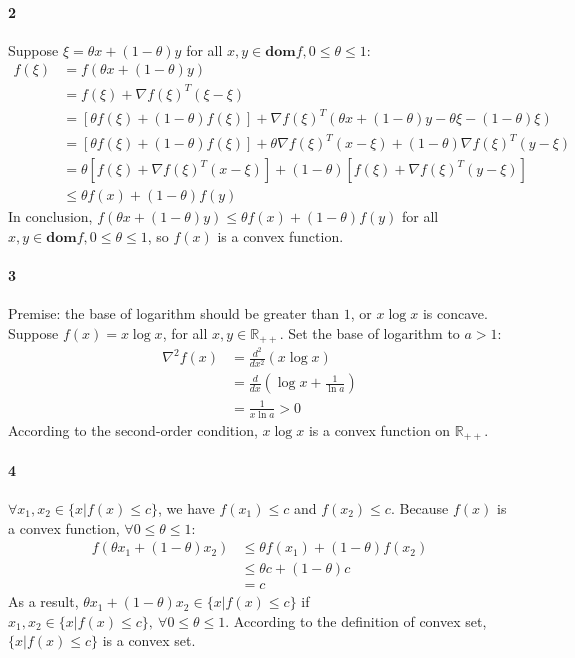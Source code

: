 \documentclass[22pt]{article}
\begin{document}
	\paragraph{2} Suppose $\xi = \theta x +(1-\theta)y$ for all $x,y \in \mathbf{dom}f, 0 \leq \theta \leq 1$:
	\begin{align}
		f(\xi) & =  f(\theta x + (1-\theta) y)\\
		& =  f(\xi) + \nabla f(\xi)^T(\xi-\xi)\\
		& =  [\theta f(\xi) +(1-\theta)f(\xi)]+ \nabla f(\xi)^T (\theta x +(1-\theta)y - \theta \xi-(1-\theta)\xi)\\
		& = [\theta f(\xi) +(1-\theta)f(\xi)] + \theta\nabla f(\xi)^T(x-\xi) + (1-\theta)\nabla f(\xi)^T(y-\xi)\\
		& = \theta[f(\xi) + \nabla f(\xi)^T(x-\xi)]+(1-\theta)[f(\xi)+\nabla f(\xi)^T(y-\xi)]\\
		& \leq \theta f(x) + (1-\theta)f(y)
	\end{align}
		In conclusion, $ f(\theta x + (1-\theta) y) \leq \theta f(x) + (1-\theta)f(y)$ for all $x,y \in \mathbf{dom}f, 0 \leq \theta \leq 1$, so $f(x)$ is a convex function.

	\paragraph{3} Premise: the base of logarithm should be greater than $1$, or $x\log x$ is concave.
	Suppose $f(x) = x\log x$, for all $x,y \in \mathbb{R}_{++}$. Set the base of logarithm to $a > 1$:
	\begin{align}
		\nabla^2 f(x) & = \frac{d^2}{dx^2}( x\log x)\\
		& = \frac{d}{dx} (\log x+\frac{1}{\ln a})\\
		& = \frac{1}{x\ln a}>0
	\end{align}
	According to the second-order condition, $x\log x$ is a convex function on $\mathbb{R_{++}}$.

	\paragraph{4} $\forall x_1,x_2 \in \{x|f(x)\leq c\}$, we have $f(x_1)\leq c$ and $f(x_2)\leq c$. Because $f(x)$ is a convex function, $ \forall 0 \leq \theta \leq 1$:
	\begin{align}
		f(\theta x_1 + (1-\theta)x_2) & \leq \theta f(x_1) + (1-\theta)f(x_2)\\
		& \leq \theta c + (1-\theta)c\\
		& = c
	\end{align}
	As a result, $\theta x_1 + (1-\theta)x_2 \in \{x|f(x)\leq c\}$ if $ x_1,x_2 \in \{x|f(x)\leq c\}, \ \forall 0 \leq \theta \leq 1$. According to the definition of convex set, $\{x|f(x)\leq c\}$ is a convex set.
\end{document}
